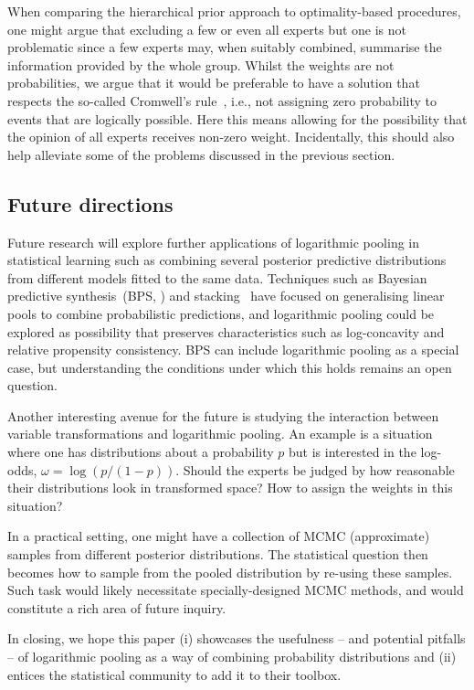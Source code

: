 \documentclass[a4paper, notitlepage, 11pt]{article}
\begin{document}
When comparing the hierarchical prior approach to optimality-based procedures, one might argue that excluding a few or even all experts but one is not problematic since a few experts may, when suitably combined, summarise the information provided by the whole group.
Whilst the weights are not probabilities, we argue that it would be preferable to have a solution that respects the so-called Cromwell's rule~\citep[pg. 91]{Lindley2013}, i.e., not assigning zero probability to events that are logically possible.
Here this means allowing for the possibility that the opinion of all experts receives non-zero weight.
Incidentally, this should also help alleviate some of the problems discussed in the previous section.

\subsection{Future directions}

Future research will explore further applications of logarithmic pooling in statistical learning such as combining several posterior predictive distributions from different models fitted to the same data.
Techniques such as Bayesian predictive synthesis~(BPS, \cite{McAlinn2018, McAlinn2019a,McAlinn2019b}) and stacking~\citep{Yao2018} have focused on generalising linear pools to combine probabilistic predictions, and logarithmic pooling could be explored as possibility that preserves characteristics such as log-concavity and relative propensity consistency.
BPS can include logarithmic pooling as a special case, but understanding the conditions under which this holds remains an open question.

Another interesting avenue for the future is studying the interaction between variable transformations and logarithmic pooling.
An example is a situation where one has distributions about a probability $p$ but is interested in the log-odds, $\omega = \log(p/(1-p))$.
Should the experts be judged by how reasonable their distributions look in transformed space?
How to assign the weights in this situation?
 
In a practical setting, one might have a collection of MCMC (approximate) samples from different posterior distributions.
The statistical question then becomes how to sample from the pooled distribution by re-using these samples.
Such task would likely necessitate specially-designed MCMC methods, and would constitute a rich area of future inquiry.

In closing, we hope this paper (i) showcases the usefulness -- and potential pitfalls -- of logarithmic pooling as a way of combining probability distributions and (ii) entices the statistical community to add it to their toolbox.
\end{document}
